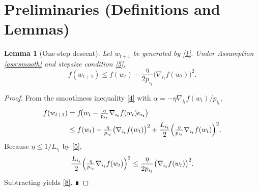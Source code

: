 \documentclass{article}
\newtheorem{lemma}{Lemma}
\begin{document}
\section*{Preliminaries (Definitions and Lemmas)}

\begin{lemma}[One‑step descent]\label{lem:descent}
Let $w_{t+1}$ be generated by \eqref{1}. Under Assumption \ref{ass:smooth}
and stepsize condition \eqref{5},
\[
f(w_{t+1})\le f(w_t)-\frac{\eta}{2p_{i_t}}
\bigl(\nabla_{i_t} f(w_t)\bigr)^{2}.
\tag{8}
\]
\end{lemma}
\begin{proof}
From the smoothness inequality \eqref{4} with $\alpha=-\eta \nabla_{i_t}f(w_t)/p_{i_t}$,
\[
\begin{aligned}
f(w_{t+1})
&=f\!\bigl(w_t-\tfrac{\eta}{p_{i_t}}\nabla_{i_t}f(w_t) e_{i_t}\bigr)\\
&\le f(w_t)-\tfrac{\eta}{p_{i_t}}\bigl(\nabla_{i_t}f(w_t)\bigr)^2
   +\frac{L_{i_t}}{2}\Bigl(\tfrac{\eta}{p_{i_t}}\nabla_{i_t}f(w_t)\Bigr)^{2}.
\end{aligned}
\]
Because $\eta\le 1/L_{i_t}$ by \eqref{5},
\[
\frac{L_{i_t}}{2}\Bigl(\tfrac{\eta}{p_{i_t}}\nabla_{i_t}f(w_t)\Bigr)^{2}
\le\frac{\eta}{2p_{i_t}}\bigl(\nabla_{i_t}f(w_t)\bigr)^{2}.
\]
Subtracting yields \eqref{8}. ∎
\end{proof}
\end{document}
